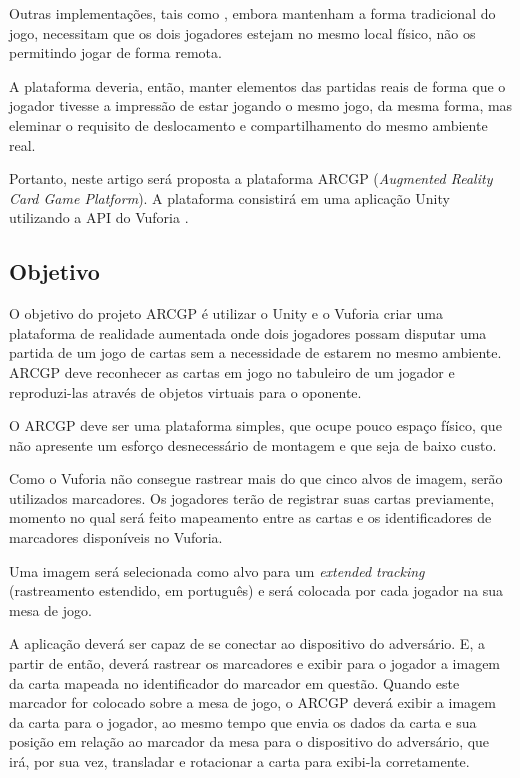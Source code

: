\documentclass[conference]{IEEEtran}
\begin{document}
Outras implementações, tais como \cite{joao}, embora mantenham a forma 
tradicional do jogo, necessitam que os dois jogadores estejam no mesmo local 
físico, não os permitindo jogar de forma remota.

A plataforma deveria, então, manter elementos das partidas reais de forma 
que o jogador tivesse a impressão de estar jogando o mesmo jogo, da mesma forma, 
mas eleminar o requisito de deslocamento e compartilhamento do mesmo ambiente 
real.

Portanto, neste artigo será proposta a plataforma ARCGP (\textit{Augmented 
Reality Card Game Platform}). A plataforma consistirá em uma aplicação 
Unity \cite{unity} utilizando a API do Vuforia \cite{vuforia}. 

\subsection{Objetivo}
\label{objetivo}
O objetivo do projeto ARCGP é utilizar o Unity e o Vuforia criar uma plataforma 
de realidade aumentada onde dois jogadores possam disputar uma partida de um 
jogo de cartas sem a necessidade de estarem no mesmo ambiente. ARCGP deve 
reconhecer as cartas em jogo no tabuleiro de um jogador e reproduzi-las através 
de objetos virtuais para o oponente.

O ARCGP deve ser uma plataforma simples, que ocupe pouco espaço físico, que não 
apresente um esforço desnecessário de montagem e que seja de baixo custo.

Como o Vuforia não consegue rastrear mais do que cinco alvos de imagem, serão 
utilizados marcadores. Os jogadores terão de registrar suas cartas previamente, 
momento no qual será feito mapeamento entre as cartas e os identificadores de 
marcadores disponíveis no Vuforia.

Uma imagem será selecionada como alvo para um \textit{extended tracking} 
(rastreamento estendido, em português) e será colocada por cada jogador na sua 
mesa de jogo.

A aplicação deverá ser capaz de se conectar ao dispositivo do adversário. E, a 
partir de então, deverá rastrear os marcadores e exibir para o jogador a imagem 
da carta mapeada no identificador do marcador em questão. Quando este marcador 
for colocado sobre a mesa de jogo, o ARCGP deverá exibir a imagem da carta para 
o jogador, ao mesmo tempo que envia os dados da carta e sua posição em relação 
ao marcador da mesa para o dispositivo do adversário, que irá, por sua vez, 
transladar e rotacionar a carta para exibi-la corretamente.
\end{document}
